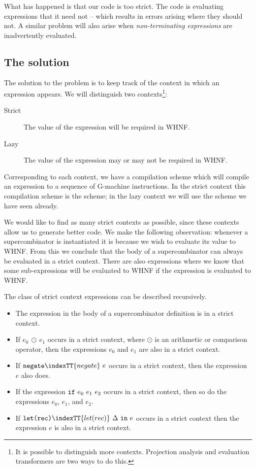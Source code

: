 What has happened is that our code is too strict.  The code is
evaluating expressions that it need not -- which results in errors
arising where they should not. A similar problem will also arise when
{\em non-terminating expressions\/}
are inadvertently evaluated.

\subsection{The solution}

The solution to the problem is to keep track of the context in which
an expression appears. We will distinguish two
contexts\footnote{It is possible to
distinguish more contexts. Projection analysis \cite{Wadler:87} and
evaluation transformers \cite{BURN91:book} are two ways to do this.}:
\begin{description}
\item[Strict] The value of the expression will
be required in WHNF.
\item[Lazy] The value of the expression may or
may not be required in WHNF.
\end{description}

Corresponding to each context, we have a compilation scheme which will
compile an expression to a sequence of G-machine instructions. In the
strict context this compilation scheme is the \tE{} scheme; in the lazy
context we will use the \tC{} scheme we have seen already.

We would like to find as many strict contexts as possible, since these
contexts allow us to generate better code. We make the following
observation: whenever a supercombinator is instantiated it is because
we wish to evaluate its value to WHNF. From this we conclude that the
body of a supercombinator can always be evaluated in a strict context.
There are also expressions where we know that some sub-expressions
will be evaluated to WHNF if the expression is evaluated to WHNF.

The class of strict context expressions can be described recursively.
\begin{itemize}
\item The expression in the body of a supercombinator definition is
in a strict context.
\item If $e_0~\odot~e_1$ occurs in a strict context, where $\odot$ is
an arithmetic or comparison operator, then the expressions $e_0$ and
$e_1$ are also in a strict context.
\item If $\mbox{\tt negate}\indexTT{negate}~e$ occurs in a strict context, then the expression
$e$ also does.
\item If the expression $\mbox{\tt if}~e_0~e_1~e_2$ occurs in a strict context, then so do the
expressions $e_0$, $e_1$, and $e_2$.
\item If $\mbox{\tt let(rec)}\indexTT{let(rec)}~\Delta~\mbox{\tt in}~e$ occurs in a strict context then
the expression $e$ is also in a strict context.
\end{itemize}

